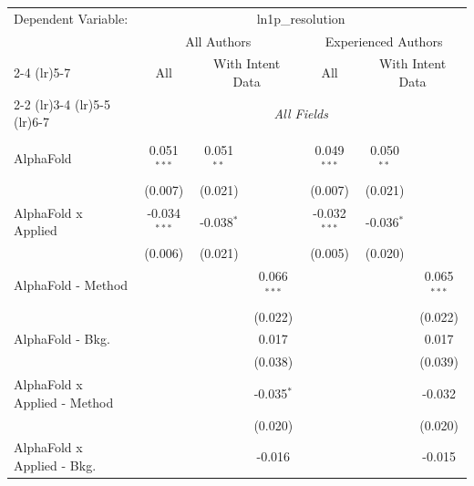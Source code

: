 \begingroup
\centering
\begin{tabular}{lcccccc}
   \tabularnewline \midrule \midrule
   Dependent Variable: & \multicolumn{6}{c}{ln1p\_resolution}\\
 & \multicolumn{3}{c}{All Authors} & \multicolumn{3}{c}{Experienced Authors} \\
\cmidrule(lr){2-4} \cmidrule(lr){5-7}
 & \multicolumn{1}{c}{All} & \multicolumn{2}{c}{With Intent Data} & \multicolumn{1}{c}{All} & \multicolumn{2}{c}{With Intent Data} \\
\cmidrule(lr){2-2} \cmidrule(lr){3-4} \cmidrule(lr){5-5} \cmidrule(lr){6-7}
 & \multicolumn{6}{c}{\textit{All Fields}} \\ \\
   AlphaFold                      & 0.051$^{***}$  & 0.051$^{**}$ &                & 0.049$^{***}$  & 0.050$^{**}$ &   \\   
                                  & (0.007)        & (0.021)      &                & (0.007)        & (0.021)      &   \\   
   AlphaFold x Applied            & -0.034$^{***}$ & -0.038$^{*}$ &                & -0.032$^{***}$ & -0.036$^{*}$ &   \\   
                                  & (0.006)        & (0.021)      &                & (0.005)        & (0.020)      &   \\   
   AlphaFold - Method             &                &              & 0.066$^{***}$  &                &              & 0.065$^{***}$\\   
                                  &                &              & (0.022)        &                &              & (0.022)\\   
   AlphaFold - Bkg.               &                &              & 0.017          &                &              & 0.017\\   
                                  &                &              & (0.038)        &                &              & (0.039)\\   
   AlphaFold x Applied - Method   &                &              & -0.035$^{*}$   &                &              & -0.032\\   
                                  &                &              & (0.020)        &                &              & (0.020)\\   
   AlphaFold x Applied - Bkg.     &                &              & -0.016         &                &              & -0.015\\   

\end{tabular}
